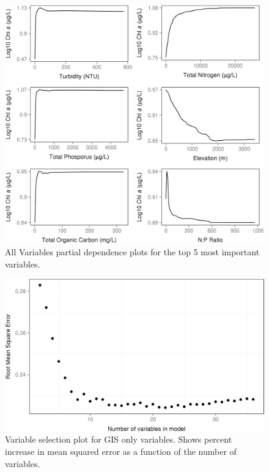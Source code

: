 \documentclass[12pt,]{article}
\begin{document}
\begin{figure}[htbp]
\centering
\includegraphics{manuscript_files/figure-latex/all_partial_dependence-1.jpeg}
\caption{All Variables partial dependence plots for the top 5 most
important variables. \label{fig:all_partial_dependence}}
\end{figure}

\newpage

\begin{figure}[htbp]
\centering
\includegraphics{manuscript_files/figure-latex/gis_var_sel_figure-1.jpeg}
\caption{Variable selection plot for GIS only variables. Shows percent
increase in mean squared error as a function of the number of variables.
\label{fig:gis_varsel_figure}}
\end{figure}
\end{document}
